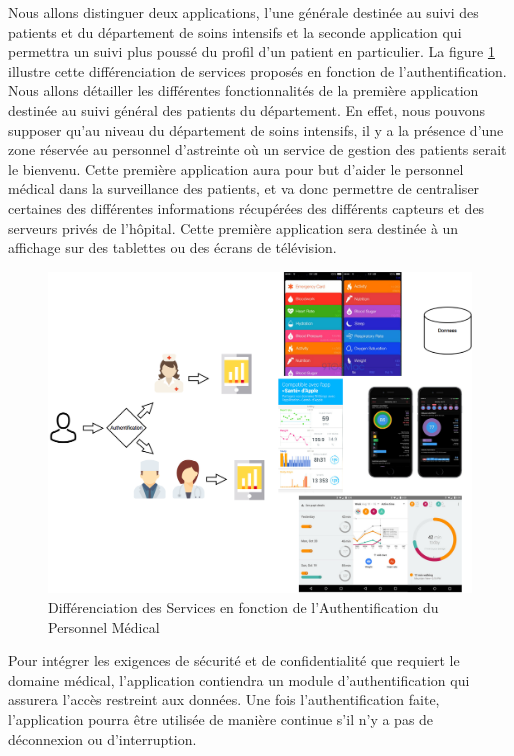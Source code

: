 Nous allons distinguer deux applications, l’une générale destinée au suivi des patients et du département de soins intensifs et la
seconde application qui permettra un suivi plus poussé du profil d’un patient en particulier. La figure \ref{appli} illustre cette
différenciation de services proposés en fonction de l'authentification. Nous allons détailler les différentes fonctionnalités de
la première application destinée au suivi général des patients du département. En effet, nous pouvons supposer qu’au niveau du
département de soins intensifs, il y a la présence d’une zone réservée au personnel d’astreinte où un service de gestion des
patients serait le bienvenu. Cette première application aura pour but d’aider le personnel médical dans la surveillance des
patients, et va donc permettre de centraliser certaines des différentes informations récupérées des différents capteurs et des
serveurs privés de l’hôpital. Cette première application sera destinée à un affichage sur des tablettes ou des écrans de télévision.  \\
\begin{figure}[h!]
	\hspace*{-2.5cm}
	\centering
	\includegraphics[width=1.4\textwidth]{Application.png}
	\caption{Différenciation des Services en fonction de l'Authentification du Personnel Médical}
	\label{appli}
\end{figure}

Pour intégrer les exigences de sécurité et de confidentialité que requiert le domaine médical, l’application contiendra un module
d’authentification qui assurera l’accès restreint aux données. Une fois l’authentification faite, l’application pourra être
utilisée de manière continue s’il n’y a pas de déconnexion ou d’interruption.



